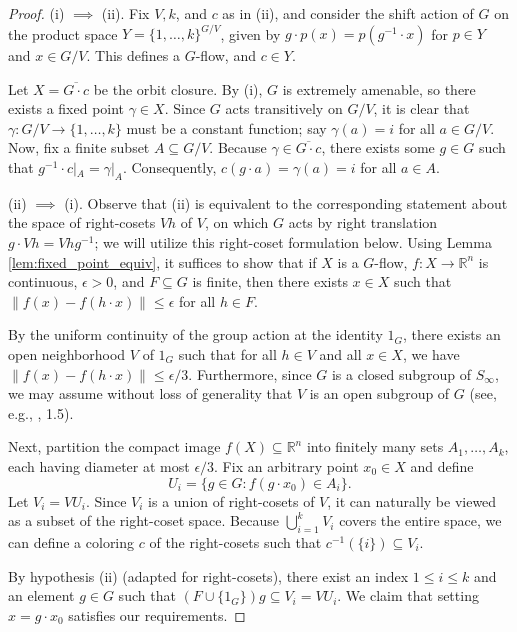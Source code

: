 \begin{proof}
    (i) $\implies$ (ii). Fix $V, k$, and $c$ as in (ii), and consider the shift action of $G$ on the product space $Y = \{1, \dots, k\}^{G/V}$, given by $g \cdot p(x) = p(g^{-1} \cdot x)$ for $p \in Y$ and $x \in G/V$. This defines a $G$-flow, and $c \in Y$.

    Let $X = \overline{G \cdot c}$ be the orbit closure. By (i), $G$ is extremely amenable, so there exists a fixed point $\gamma \in X$. Since $G$ acts transitively on $G/V$, it is clear that $\gamma: G/V \to \{1, \dots, k\}$ must be a constant function; say $\gamma(a) = i$ for all $a \in G/V$.
    Now, fix a finite subset $A \subseteq G/V$. Because $\gamma \in \overline{G \cdot c}$, there exists some $g \in G$ such that $g^{-1} \cdot c|_A = \gamma|_A$. Consequently, $c(g \cdot a) = \gamma(a) = i$ for all $a \in A$.

    (ii) $\implies$ (i). Observe that (ii) is equivalent to the corresponding statement about the space of right-cosets $Vh$ of $V$, on which $G$ acts by right translation $g \cdot Vh = Vhg^{-1}$; we will utilize this right-coset formulation below. Using Lemma \ref{lem:fixed_point_equiv}, it suffices to show that if $X$ is a $G$-flow, $f: X \to \mathbb{R}^n$ is continuous, $\epsilon > 0$, and $F \subseteq G$ is finite, then there exists $x \in X$ such that $\|f(x) - f(h \cdot x)\| \le \epsilon$ for all $h \in F$.

    By the uniform continuity of the group action at the identity $1_G$, there exists an open neighborhood $V$ of $1_G$ such that for all $h \in V$ and all $x \in X$, we have $\|f(x) - f(h \cdot x)\| \le \epsilon / 3$. Furthermore, since $G$ is a closed subgroup of $S_\infty$, we may assume without loss of generality that $V$ is an open subgroup of $G$ (see, e.g., \cite{BK}, 1.5).

    Next, partition the compact image $f(X) \subseteq \mathbb{R}^n$ into finitely many sets $A_1, \dots, A_k$, each having diameter at most $\epsilon / 3$. Fix an arbitrary point $x_0 \in X$ and define
    $$
        U_i = \{g \in G : f(g \cdot x_0) \in A_i\}.
    $$
    Let $V_i = V U_i$. Since $V_i$ is a union of right-cosets of $V$, it can naturally be viewed as a subset of the right-coset space. Because $\bigcup_{i=1}^k V_i$ covers the entire space, we can define a coloring $c$ of the right-cosets such that $c^{-1}(\{i\}) \subseteq V_i$.

    By hypothesis (ii) (adapted for right-cosets), there exist an index $1 \le i \le k$ and an element $g \in G$ such that $(F \cup \{1_G\})g \subseteq V_i = V U_i$. We claim that setting $x = g \cdot x_0$ satisfies our requirements.


\end{proof}
